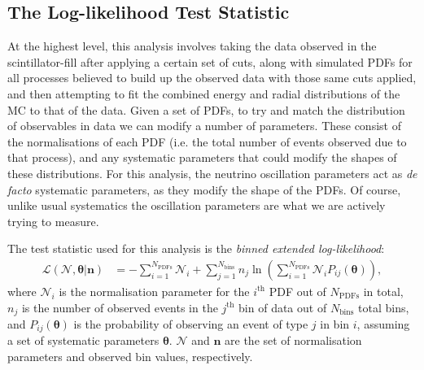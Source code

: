 \subsection{The Log-likelihood Test Statistic}\label{sec:test_statistic}
At the highest level, this analysis involves taking the data observed in the scintillator-fill after applying a certain set of cuts, along with simulated PDFs for all processes believed to build up the observed data with those same cuts applied, and then attempting to fit the combined energy and radial distributions of the MC to that of the data. Given a set of PDFs, to try and match the distribution of observables in data we can modify a number of parameters. These consist of the normalisations of each PDF (i.e. the total number of events observed due to that process), and any systematic parameters that could modify the shapes of these distributions. For this analysis, the neutrino oscillation parameters act as \textit{de facto} systematic parameters, as they modify the shape of the \beight{} PDFs. Of course, unlike usual systematics the oscillation parameters are what we are actively trying to measure.

The test statistic used for this analysis is the \textit{binned extended log-likelihood}:
\begin{align}
    \mathcal{L}\left(\bm{\mathcal{N}}, \bm{\theta} | \bm{n}\right) &=
    -\sum_{i=1}^{N_{\mathrm{PDFs}}}\mathcal{N}_{i} 
    + \sum_{j=1}^{N_{\mathrm{bins}}}n_{j}\ln{\left(\sum_{i=1}^{N_{\textrm{PDFs}}} \mathcal{N}_{i}P_{ij}\left(\bm{\theta}\right)\right)},%
\end{align}
where $\mathcal{N}_{i}$ is the normalisation parameter for the $i^{\mathrm{th}}$ PDF out of $N_{\mathrm{PDFs}}$ in total, $n_{j}$ is the number of observed events in the $j^{\mathrm{th}}$ bin of data out of $N_{\mathrm{bins}}$ total bins, and $P_{ij}\left(\bm{\theta}\right)$ is the probability of observing an event of type $j$ in bin $i$, assuming a set of systematic parameters $\bm{\theta}$. $\bm{\mathcal{N}}$ and $\bm{n}$ are the set of normalisation parameters and observed bin values, respectively.

